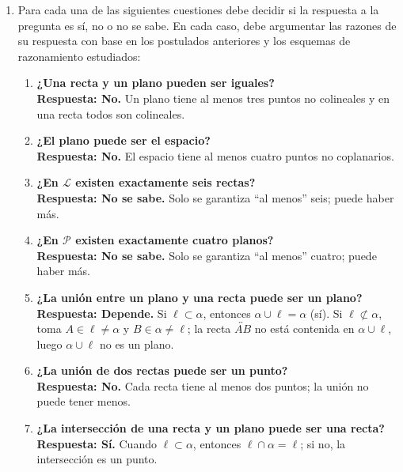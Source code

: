 \documentclass[12pt,letterpaper]{exam}
\begin{document}
\begin{enumerate}
 \item Para cada una de las siguientes cuestiones debe decidir si la respuesta a la pregunta es s\'i, no
    o no se sabe. En cada caso, debe argumentar las razones de su respuesta con base en los
    postulados anteriores y los esquemas de razonamiento estudiados:

\begin{enumerate}
  \item \textbf{¿Una recta y un plano pueden ser iguales?} \\
        \textbf{Respuesta: No.} Un plano tiene al menos tres puntos no colineales y en una recta todos son colineales.

  \item \textbf{¿El plano puede ser el espacio?} \\
        \textbf{Respuesta: No.} El espacio tiene al menos cuatro puntos no coplanarios.

  \item \textbf{¿En $\mathscr{L}$ existen exactamente seis rectas?} \\
        \textbf{Respuesta: No se sabe.} Solo se garantiza “al menos” seis; puede haber más.

  \item \textbf{¿En $\mathscr{P}$ existen exactamente cuatro planos?} \\
        \textbf{Respuesta: No se sabe.} Solo se garantiza “al menos” cuatro; puede haber más.

  \item \textbf{¿La unión entre un plano y una recta puede ser un plano?} \\
        \textbf{Respuesta: Depende.} 
        Si $\ell\subset\alpha$, entonces $\alpha\cup\ell=\alpha$ (sí). 
        Si $\ell\not\subset\alpha$, toma $A\in\ell\neq\alpha$ y $B\in\alpha\neq\ell$; la recta $\overleftrightarrow{AB}$ no está contenida en $\alpha\cup\ell$, luego $\alpha\cup\ell$ no es un plano.

  \item \textbf{¿La unión de dos rectas puede ser un punto?} \\
        \textbf{Respuesta: No.} Cada recta tiene al menos dos puntos; la unión no puede tener menos.

  \item \textbf{¿La intersección de una recta y un plano puede ser una recta?} \\
        \textbf{Respuesta: Sí.} Cuando $\ell\subset\alpha$, entonces $\ell\cap\alpha=\ell$; si no, la intersección es un punto.


\end{enumerate}
\end{enumerate}
\end{document}
